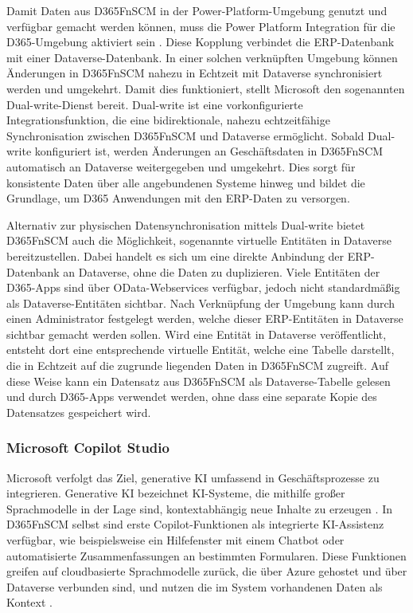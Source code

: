 Damit Daten aus \ac{D365FnSCM} in der Power-Platform-Umgebung genutzt und verfügbar gemacht werden können, muss die Power Platform Integration für die D365-Umgebung aktiviert sein \cite{cabeln_enable_2025}. Diese Kopplung verbindet die \ac{ERP}-Datenbank mit einer Dataverse-Datenbank. In einer solchen verknüpften Umgebung können Änderungen in \ac{D365FnSCM} nahezu in Echtzeit mit Dataverse synchronisiert werden und umgekehrt. Damit dies funktioniert, stellt Microsoft den sogenannten Dual-write-Dienst bereit. Dual-write ist eine vorkonfigurierte Integrationsfunktion, die eine bidirektionale, nahezu echtzeitfähige Synchronisation zwischen \ac{D365FnSCM} und Dataverse ermöglicht. Sobald Dual-write konfiguriert ist, werden Änderungen an Geschäftsdaten in \ac{D365FnSCM} automatisch an Dataverse weitergegeben und umgekehrt. Dies sorgt für konsistente Daten über alle angebundenen Systeme hinweg und bildet die Grundlage, um D365 Anwendungen mit den ERP-Daten zu versorgen. \cite{ramakrishnamoorthy_dual-write_2024}

Alternativ zur physischen Datensynchronisation mittels Dual-write bietet \ac{D365FnSCM} auch die Möglichkeit, sogenannte virtuelle Entitäten in Dataverse bereitzustellen. Dabei handelt es sich um eine direkte Anbindung der ERP-Datenbank an Dataverse, ohne die Daten zu duplizieren. Viele Entitäten der D365-Apps sind über OData-Webservices verfügbar, jedoch nicht standardmäßig als Dataverse-Entitäten sichtbar. Nach Verknüpfung der Umgebung kann durch einen Administrator festgelegt werden, welche dieser ERP-Entitäten in Dataverse sichtbar gemacht werden sollen. Wird eine Entität in Dataverse veröffentlicht, entsteht dort eine entsprechende virtuelle Entität, welche eine Tabelle darstellt, die in Echtzeit auf die zugrunde liegenden Daten in \ac{D365FnSCM} zugreift. Auf diese Weise kann ein Datensatz aus \ac{D365FnSCM} als Dataverse-Tabelle gelesen und durch D365-Apps verwendet werden, ohne dass eine separate Kopie des Datensatzes gespeichert wird. \cite{jaredha_enable_2025}

\subsubsection{Microsoft Copilot Studio}

Microsoft verfolgt das Ziel, generative \ac{KI} umfassend in Geschäftsprozesse zu integrieren. Generative \ac{KI} bezeichnet KI-Systeme, die mithilfe großer Sprachmodelle in der Lage sind, kontextabhängig neue Inhalte zu erzeugen \cite[]{sengar_generative_2024}. In \ac{D365FnSCM} selbst sind erste Copilot-Funktionen als integrierte KI-Assistenz verfügbar, wie beispielsweise ein Hilfefenster mit einem Chatbot oder automatisierte Zusammenfassungen an bestimmten Formularen. Diese Funktionen greifen auf cloudbasierte Sprachmodelle zurück, die über Azure gehostet und über Dataverse verbunden sind, und nutzen die im System vorhandenen Daten als Kontext \cite{cabeln_enable_2025}.


